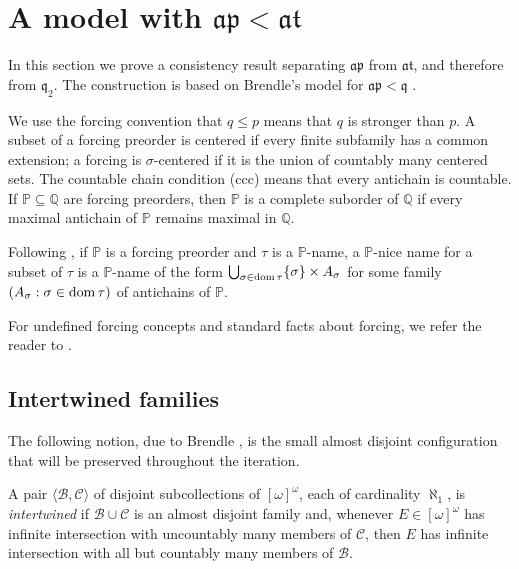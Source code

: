 \section{A model with $\mathfrak{ap}<\mathfrak{at}$}
\label{sec:ap-below-at-model}

In this section we prove a consistency result separating $\mathfrak{ap}$ from
$\mathfrak{at}$, and therefore from $\mathfrak q_{2}$.
The construction is based on Brendle's model for
$\mathfrak{ap}<\mathfrak q$ \cite{brendle1999dow}.

We use the forcing convention that $q\leq p$ means that $q$ is stronger than
$p$.  A subset of a forcing preorder is centered if every finite subfamily has
a common extension; a forcing is $\sigma$-centered if it is the union of
countably many centered sets.  The countable chain condition (ccc) means that
every antichain is countable.  If $\mathbb P\subseteq\mathbb Q$ are forcing
preorders, then $\mathbb P$ is a complete suborder of $\mathbb Q$ if every
maximal antichain of $\mathbb P$ remains maximal in $\mathbb Q$.

Following \cite{kunen2011set}, if $\mathbb P$ is a forcing preorder and $\tau$ is a $\mathbb P$-name, a $\mathbb P$-nice name for a subset of $\tau$ is a $\mathbb P$-name of the form $\bigcup_{\sigma \in \operatorname{dom} \tau}\{\sigma\}\times A_\sigma$ for some family $(A_\sigma:\sigma\in\operatorname{dom} \tau)$ of antichains of $\mathbb P$.

For undefined forcing concepts and standard facts about forcing, we refer the reader to \cite{kunen2011set}.

\subsection{Intertwined families}
\label{subsec:intertwined-families}

The following notion, due to
Brendle \cite{brendle1999dow}, is the small almost disjoint configuration that will be preserved
throughout the iteration.
\begin{definition}\label{def:intertwined}
A pair $\langle\mathcal B,\mathcal C\rangle$ of disjoint subcollections of
$[\omega]^\omega$, each of cardinality $\aleph_1$, is \emph{intertwined} if
$\mathcal B\cup\mathcal C$ is an almost disjoint family and, whenever
$E\in[\omega]^\omega$ has infinite intersection with uncountably many members
of $\mathcal C$, then $E$ has infinite intersection with all but countably many
members of $\mathcal B$.
\end{definition}

